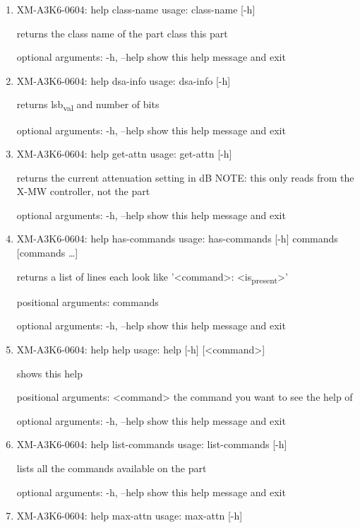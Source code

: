 \documentclass[11pt]{article}
\begin{document}
\begin{enumerate}
\item XM-A3K6-0604: help class-name
\label{sec:org6e0da89}
usage: class-name [-h]

returns the class name of the part class this part

optional arguments:
  -h, --help  show this help message and exit

\item XM-A3K6-0604: help dsa-info
\label{sec:orgf11d488}
usage: dsa-info [-h]

returns lsb\textsubscript{val} and number of bits

optional arguments:
  -h, --help  show this help message and exit

\item XM-A3K6-0604: help get-attn
\label{sec:org24d8f7d}
usage: get-attn [-h]

returns the current attenuation setting in dB NOTE: this only reads from the
X-MW controller, not the part

optional arguments:
  -h, --help  show this help message and exit

\item XM-A3K6-0604: help has-commands
\label{sec:org6469f53}
usage: has-commands [-h] commands [commands \ldots{}]

returns a list of lines each look like '<command>: <is\textsubscript{present}>'

positional arguments:
  commands

optional arguments:
  -h, --help  show this help message and exit

\item XM-A3K6-0604: help help
\label{sec:org32c20d7}
usage: help [-h] [<command>]

shows this help

positional arguments:
  <command>   the command you want to see the help of

optional arguments:
  -h, --help  show this help message and exit

\item XM-A3K6-0604: help list-commands
\label{sec:orgb024bcf}
usage: list-commands [-h]

lists all the commands available on the part

optional arguments:
  -h, --help  show this help message and exit

\item XM-A3K6-0604: help max-attn
\label{sec:org41142ff}
usage: max-attn [-h]


\end{enumerate}
\end{document}
